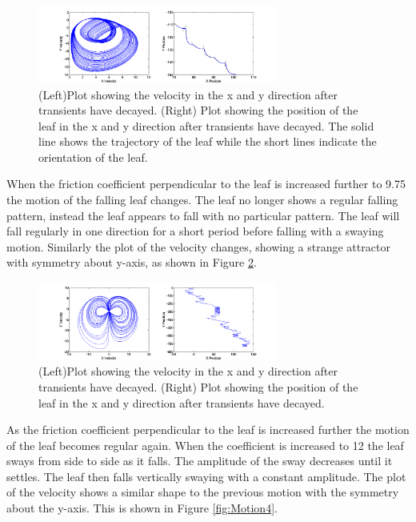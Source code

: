 \begin{figure}[H]
\centering
\includegraphics[width=0.7\textwidth]{Motion_Graphs/Motion2.png}
\caption{\label{fig:Motion2}(Left)Plot showing the velocity in the x and y direction after transients have decayed. (Right) Plot showing the position of the leaf in the x and y direction after transients have decayed. The solid line shows the trajectory of the leaf while the short lines indicate the orientation of the leaf.
}
\end{figure}

When the friction coefficient perpendicular to the leaf is increased further to 9.75 the motion of the falling leaf changes. The leaf no longer shows a regular falling pattern, instead the leaf appears to fall with no particular pattern. The leaf will fall regularly in one direction for a short period before falling with a swaying motion. Similarly the plot of the velocity changes, showing a strange attractor with symmetry about y-axis, as shown in Figure \ref{fig:Motion3}. 

\begin{figure}[H]
\centering
\includegraphics[width=0.7\textwidth]{Motion_Graphs/Motion3.png}
\caption{\label{fig:Motion3}(Left)Plot showing the velocity in the x and y direction after transients have decayed. (Right) Plot showing the position of the leaf in the x and y direction after transients have decayed.
}
\end{figure}

As the friction coefficient perpendicular to the leaf is increased further the motion of the leaf becomes regular again. When the coefficient is increased to 12 the leaf sways from side to side as it falls. The amplitude of the sway decreases until it settles. The leaf then falls vertically swaying with a constant amplitude. The plot of the velocity shows a similar shape to the previous motion with the symmetry about the y-axis. This is shown in Figure \ref{fig:Motion4}.

